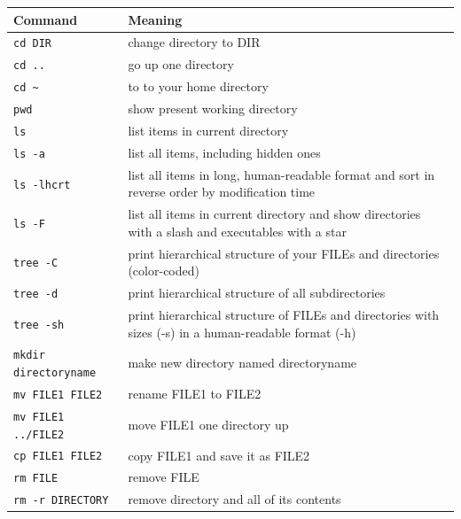 \documentclass[11pt]{article}
\begin{document}
\begin{center}
\begin{tabular}{p{4cm}p{10cm}}
Command & Meaning\\
\hline
\texttt{cd DIR} & change directory to DIR\\
\hline
\texttt{cd ..} & go up one directory\\
\hline
\texttt{cd \textasciitilde{}} & to to your home directory\\
\hline
\texttt{pwd} & show present working directory\\
\hline
\texttt{ls} & list items in current directory\\
\hline
\texttt{ls -a} & list all items, including hidden ones\\
\hline
\texttt{ls -lhcrt} & list all items in long, human-readable format and sort in reverse order by modification time\\
\hline
\texttt{ls -F} & list all items in current directory and show directories with a slash and executables with a star\\
\hline
\texttt{tree  -C} & print hierarchical structure of your FILEs and directories (color-coded)\\
\hline
\texttt{tree -d} & print hierarchical structure of all subdirectories\\
\hline
\texttt{tree -sh} & print hierarchical structure of FILEs and directories with sizes (-s) in a human-readable format (-h)\\
\hline
\texttt{mkdir directoryname} & make new directory named directoryname\\
\hline
\texttt{mv FILE1 FILE2} & rename FILE1 to FILE2\\
\hline
\texttt{mv FILE1 ../FILE2} & move FILE1 one directory up\\
\hline
\texttt{cp FILE1 FILE2} & copy FILE1 and save it as FILE2\\
\hline
\texttt{rm FILE} & remove FILE\\
\hline
\texttt{rm -r DIRECTORY} & remove directory and all of its contents\\
\end{tabular}
\end{center}
\end{document}
